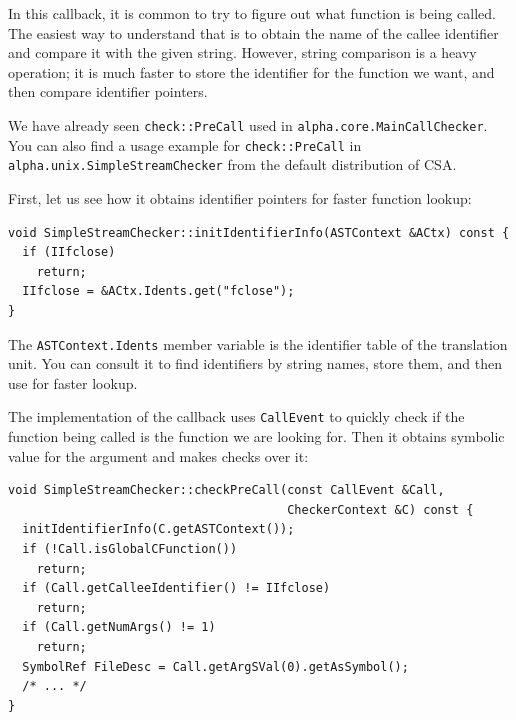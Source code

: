 \documentclass[a4paper,12pt]{article}
\newenvironment{nobr}{\begin{minipage}{\textwidth}\setlength\parskip{1em}
}{\end{minipage}\ignorespacesafterend}
\begin{document}
In this callback, it is common to try to figure out what function is being called. The easiest way to understand that is to obtain the name of the callee identifier and compare it with the given string. However, string comparison is a heavy operation; it is much faster to store the identifier for the function we want, and then compare identifier pointers.

We have already seen \lstinline|check::PreCall| used in \lstinline|alpha.core.MainCallChecker|. You can also find a usage example for \lstinline|check::PreCall| in \lstinline|alpha.unix.SimpleStreamChecker| from the default distribution of CSA.

\begin{nobr}
First, let us see how it obtains identifier pointers for faster function lookup:

\begin{lstlisting}[style=cplusplus]
void SimpleStreamChecker::initIdentifierInfo(ASTContext &ACtx) const {
  if (IIfclose)
    return;
  IIfclose = &ACtx.Idents.get("fclose");
}
\end{lstlisting}
\end{nobr}

The \lstinline|ASTContext.Idents| member variable is the identifier table of the translation unit. You can consult it to find identifiers by string names, store them, and then use for faster lookup.

\begin{nobr}
The implementation of the callback uses \lstinline|CallEvent| to quickly check if the function being called is the function we are looking for. Then it obtains symbolic value for the argument and makes checks over it:

\begin{lstlisting}[style=cplusplus]
void SimpleStreamChecker::checkPreCall(const CallEvent &Call,
                                       CheckerContext &C) const {
  initIdentifierInfo(C.getASTContext()); 
  if (!Call.isGlobalCFunction())
    return;
  if (Call.getCalleeIdentifier() != IIfclose)
    return;
  if (Call.getNumArgs() != 1)
    return;
  SymbolRef FileDesc = Call.getArgSVal(0).getAsSymbol();
  /* ... */
}
\end{lstlisting}
\end{nobr}
\end{document}
